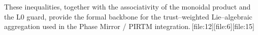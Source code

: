 \documentclass[11pt]{article}
\begin{document}
These inequalities, together with the associativity of the monoidal product
and the L0 guard, provide the formal backbone for the trust--weighted
Lie--algebraic aggregation used in the Phase Mirror / PIRTM integration.\,[file:12][file:6][file:15]


\nocite{*}
  

\end{document}
